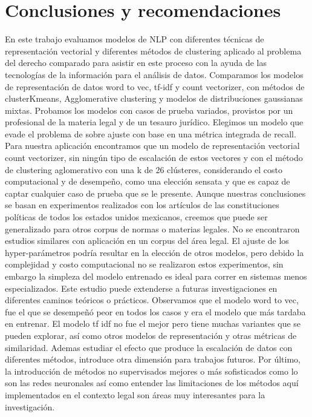 \documentclass[12pt]{article}
\begin{document}
	\newpage
	\section*{Conclusiones y recomendaciones}
	En este trabajo evaluamos modelos de NLP con diferentes técnicas de representación vectorial y diferentes métodos de clustering aplicado al problema del derecho comparado para asistir en este proceso con la ayuda de las tecnologías de la información para el análisis de datos. 
	Comparamos los modelos de representación de datos word to vec, tf-idf y count vectorizer, con métodos de clusterKmeans, Agglomerative clustering y modelos de distribuciones gaussianas mixtas.
	Probamos los modelos con casos de prueba variados, provistos por un profesional de la materia legal y de un tesauro jurídico. 
	Elegimos un modelo que evade el problema de sobre ajuste con base en una métrica integrada de recall.
	Para nuestra aplicación encontramos que un modelo de representación vectorial count vectorizer, sin ningún tipo de escalación de estos vectores y  con el método de clustering aglomerativo con una k de 26 clústeres, considerando el costo computacional y de desempeño, como una elección sensata y que es capaz de captar cualquier caso de prueba que se le presente.
	Aunque nuestras conclusiones se basan en experimentos realizados con los artículos de las constituciones políticas de todos los estados unidos mexicanos, creemos que puede ser generalizado para otros corpus de normas o materias legales.
	No se encontraron estudios similares con aplicación en un corpus del área legal.
	El ajuste de los hyper-parámetros podría resultar en la elección de otros modelos, pero debido  la complejidad y costo computacional no se realizaron estos experimentos, sin embargo la simpleza del modelo entrenado es ideal para correr en sistemas menos especializados.
	Este estudio puede extenderse a futuras investigaciones en diferentes caminos teóricos o prácticos. Observamos que el modelo word to vec, fue el que se desempeñó peor en todos los casos y era el modelo que más tardaba en entrenar. El modelo tf idf no fue el mejor pero tiene muchas variantes que se pueden explorar, así como otros modelos de representación y otras métricas de similaridad. Ademas estudiar el efecto que produce la escalación de datos con diferentes métodos, introduce otra dimensión para trabajos futuros. 
	Por último, la introducción de métodos no supervisados mejores o más sofisticados como lo son las redes neuronales así como entender las limitaciones de los métodos aquí implementados en el contexto legal son áreas muy interesantes para la investigación.
	
\end{document}
